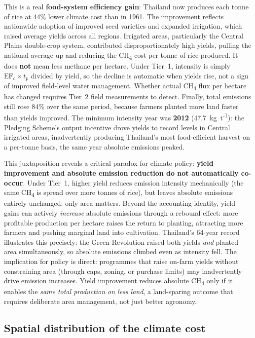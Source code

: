 \documentclass[fleqn,10pt]{olplainarticle}
\begin{document}
This is a real \textbf{food-system efficiency gain}: Thailand now produces
each tonne of rice at 44\% lower climate cost than in 1961.
The improvement reflects nationwide adoption of improved seed varieties
and expanded irrigation, which raised average yields across all regions.
Irrigated areas, particularly the Central Plains double-crop system,
contributed disproportionately high yields, pulling the national average up
and reducing the CH\textsubscript{4} cost per tonne of rice produced.
It does \textbf{not} mean less methane per hectare.
Under Tier~1, intensity is simply $\text{EF}_c \times t_p$ divided by yield, so the
decline is automatic when yields rise, not a sign of improved field-level water
management.
Whether actual CH\textsubscript{4} flux per hectare has changed requires Tier~2 field
measurements to detect.
Finally, total emissions still rose 84\% over the same period, because farmers planted
more land faster than yields improved.
The minimum intensity year was \textbf{2012} (47.7~kg~t\textsuperscript{-1}):
the Pledging Scheme's output incentive drove yields to record levels in
Central irrigated areas, inadvertently producing Thailand's most food-efficient
harvest on a per-tonne basis, the same year absolute emissions peaked.

This juxtaposition reveals a critical paradox for climate policy: \textbf{yield
improvement and absolute emission reduction do not automatically co-occur}.
Under Tier~1, higher yield reduces emission intensity mechanically (the same
CH\textsubscript{4} is spread over more tonnes of rice), but leaves absolute
emissions entirely unchanged: only area matters.
Beyond the accounting identity, yield gains can actively \textit{increase}
absolute emissions through a rebound effect: more profitable production per
hectare raises the return to planting, attracting more farmers and pushing
marginal land into cultivation.
Thailand's 64-year record illustrates this precisely: the Green Revolution
raised both yields \textit{and} planted area simultaneously, so absolute
emissions climbed even as intensity fell.
The implication for policy is direct: programmes that raise on-farm yields
without constraining area (through caps, zoning, or purchase limits) may
inadvertently drive emission increases.
Yield improvement reduces absolute CH\textsubscript{4} only if it enables
the \textit{same total production on less land}, a land-sparing outcome that
requires deliberate area management, not just better agronomy.

\FloatBarrier
\subsection*{Spatial distribution of the climate cost}
\end{document}

